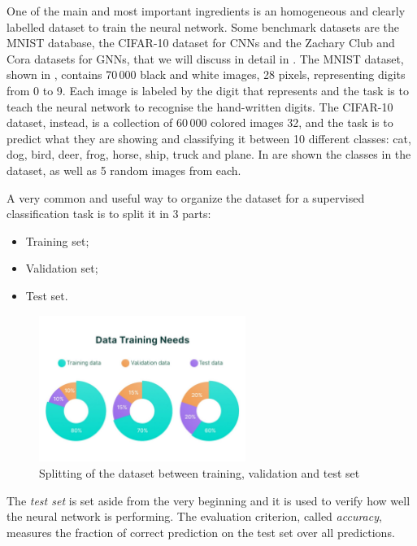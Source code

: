 \documentclass[12pt,a4paper]{report}
\theoremstyle{definition}
\begin{document}
One of the main and most important ingredients is an homogeneous and clearly labelled dataset to train the neural network.
Some benchmark datasets are the MNIST database, the CIFAR-10 dataset \cite{CIFAR_dataset} for CNNs and the Zachary Club and Cora datasets for GNNs, that we will discuss in detail in . The MNIST dataset, shown in , contains 70\,000 black and white images, 28 pixels, representing digits from 0 to 9.
Each image is labeled by the digit that represents and the task is to teach the neural network to recognise the hand-written digits.
The CIFAR-10 dataset, instead, is a collection of 60\,000 colored images 32, and the task is to predict what they are showing and classifying it between 10 different classes: cat, dog, bird, deer, frog, horse, ship, truck and plane. In  are shown the classes in the dataset, as well as 5 random images from each.

A very common and useful way to organize the dataset for a supervised classification task is to split it in 3 parts:

\begin{itemize}
    \item Training set;
    \item Validation set;
    \item Test set.
\end{itemize}

\begin{figure}[h]
    \centering
    \includegraphics[trim={0 2.9cm 0 6.2cm}, clip, width=0.6\textwidth]{./Images/Data_splitting.pdf}
    \caption{Splitting of the dataset between training, validation and test set}
    \label{fig:train val test}
\end{figure}

The \emph{test set} is set aside from the very beginning and it is used to verify how well the neural network is performing.
The evaluation criterion, called \emph{accuracy}, measures the fraction of correct prediction on the test set over all predictions.
\end{document}

